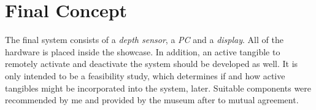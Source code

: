 %


\section{Final Concept}
\label{conception_final}


The final system consists of a \textit{depth sensor}, a \textit{PC} and a \textit{display}. All of the hardware is placed inside the showcase. In addition, an active tangible to remotely activate and deactivate the system should be developed as well. It is only intended to be a feasibility study, which determines if and how active tangibles might be incorporated into the system, later. Suitable components were recommended by me and provided by the museum after to mutual agreement.

